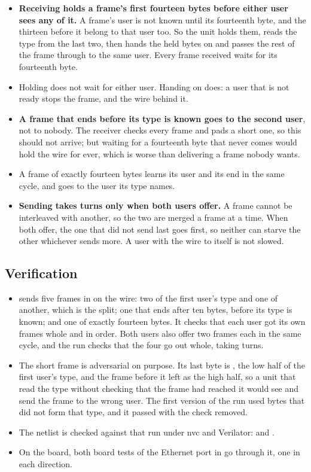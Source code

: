 \begin{itemize}
\item \textbf{Receiving holds a frame's first fourteen bytes before
either user sees any of it.} A frame's user is not known until its
fourteenth byte, and the thirteen before it belong to that user too.
So the unit holds them, reads the type from the last two, then hands
the held bytes on and passes the rest of the frame through to the
same user. Every frame received waits for its fourteenth byte.
\item Holding does not wait for either user. Handing on does: a user
that is not ready stops the frame, and the wire behind it.
\item \textbf{A frame that ends before its type is known goes to the
second user}, not to nobody. The receiver checks every frame and pads
a short one, so this should not arrive; but waiting for a fourteenth
byte that never comes would hold the wire for ever, which is worse
than delivering a frame nobody wants.
\item A frame of exactly fourteen bytes learns its user and its end
in the same cycle, and goes to the user its type names.
\item \textbf{Sending takes turns only when both users offer.} A frame
cannot be interleaved with another, so the two are merged a frame at
a time. When both offer, the one that did not send last goes first,
so neither can starve the other whichever sends more. A user with the
wire to itself is not slowed.
\end{itemize}

\subsection*{Verification}

\begin{itemize}
\item {} sends five frames in on the wire: two of the
first user's type and one of another, which is the split; one that
ends after ten bytes, before its type is known; and one of exactly
fourteen bytes. It checks that each user got its own frames whole and
in order. Both users also offer two frames each in the same cycle,
and the run checks that the four go out whole, taking turns.
\item The short frame is adversarial on purpose. Its last byte is
, the low half of the first user's type, and the frame
before it left  as the high half, so a unit that read the
type without checking that the frame had reached it would see
 and send the frame to the wrong user. The first version
of the run used bytes that did not form that type, and it passed with
the check removed.
\item The netlist is checked against that run under nvc and
Verilator:  and
.
\item On the board, both board tests of the Ethernet port in
 go through it, one in each
direction.
\end{itemize}

